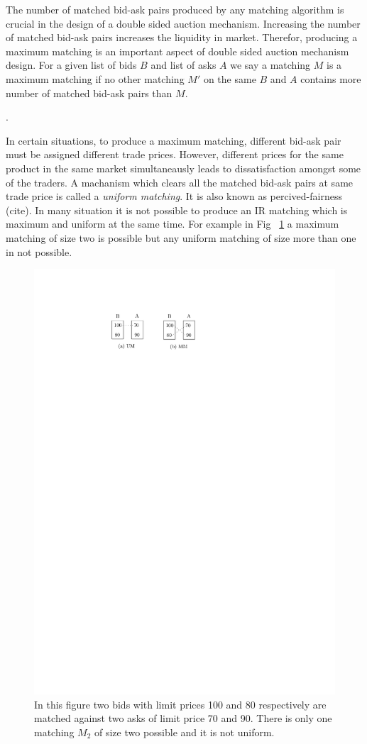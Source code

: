\documentclass[a4paper,UKenglish,cleveref, autoref]{lipics-v2019}
\begin{document}
The number of matched bid-ask pairs produced by any matching algorithm is crucial in the design of a double sided auction mechanism. Increasing the number of matched bid-ask pairs increases the liquidity in market. Therefor, producing a maximum matching is an important aspect of double sided auction mechanism design. For a given list of bids $B$ and list of asks $A$ we say a matching $M$ is a maximum matching if no other matching $M'$ on the same $B$ and $A$ contains more number of matched bid-ask pairs than $M$. 

\begin{definition}
.
\end{definition}

In certain situations, to produce a maximum matching, different bid-ask pair must be assigned different trade prices. However, different prices for the same product in the same market simultaneausly leads to dissatisfaction amongst some of the traders. A machanism which clears all the matched bid-ask pairs at same trade price is called a \emph{uniform matching}. It is also known as percived-fairness (cite). In many situation it is not possible to produce an IR matching which is maximum and uniform at the same time. For example in Fig ~\ref{fig:mmum} a maximum matching of size two is possible but any uniform matching of size more than one in not possible. 


\begin{figure}[h!]
\centering
\includegraphics[width=.5\textwidth]{mm_um.pdf}
\caption{In this figure two bids with limit prices 100 and 80 respectively are matched against two asks of limit price 70 and 90. There is only one matching $M_2$ of size two possible and it is not uniform.}
\label{fig:mmum}
\end{figure}
\end{document}
